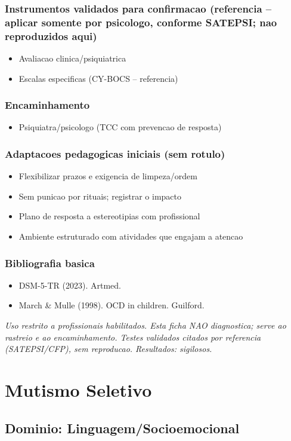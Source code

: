 \documentclass[a4paper,11pt]{book}
\newcommand{\avisolegal}{\par\medskip\noindent\footnotesize\itshape
\color{cinza}Uso restrito a profissionais habilitados. Esta ficha NAO diagnostica;
serve ao rastreio e ao encaminhamento. Testes validados citados por referencia
(SATEPSI/CFP), sem reproducao. Resultados: sigilosos.\color{black}\par}
\begin{document}
\subsection*{Instrumentos validados para confirmacao (referencia -- aplicar somente por psicologo, conforme SATEPSI; nao reproduzidos aqui)}
\begin{itemize}
\item Avaliacao clinica/psiquiatrica
\item Escalas especificas (CY-BOCS -- referencia)
\end{itemize}
\subsection*{Encaminhamento}
\begin{itemize}
\item Psiquiatra/psicologo (TCC com prevencao de resposta)
\end{itemize}
\subsection*{Adaptacoes pedagogicas iniciais (sem rotulo)}
\begin{itemize}
\item Flexibilizar prazos e exigencia de limpeza/ordem
\item Sem punicao por rituais; registrar o impacto
\item Plano de resposta a estereotipias com profissional
\item Ambiente estruturado com atividades que engajam a atencao
\end{itemize}
\subsection*{Bibliografia basica}
\begin{itemize}
\item DSM-5-TR (2023). Artmed.
\item March \& Mulle (1998). OCD in children. Guilford.
\end{itemize}
\avisolegal


\chapter{Mutismo Seletivo}
\section*{Dominio: Linguagem/Socioemocional}
\end{document}
